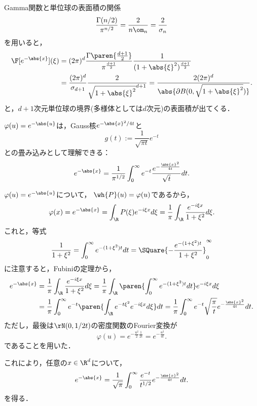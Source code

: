 \documentclass[uplatex,dvipdfmx]{jsreport}
\begin{document}
\begin{remarks}
    Gamma関数と単位球の表面積の関係
    \[\frac{\Gamma(n/2)}{\pi^{n/2}}=\frac{2}{n\om_n}=\frac{2}{\sigma_n}\]
    を用いると，
    \begin{align*}
        \F[e^{-\abs{x}}](\xi)&=(2\pi)^d\frac{\Gamma\paren{\frac{d+1}{2}}}{\pi^{\frac{d+1}{2}}}\frac{1}{(1+\abs{\xi}^2)^{\frac{d+1}{2}}}\\
        &=\frac{(2\pi)^d}{\sigma_{d+1}}\frac{2}{\sqrt{1+\abs{\xi}^2}^{d+1}}=\frac{2(2\pi)^d}{\abs{\partial B(0,\sqrt{1+\abs{\xi}^2})}}.
    \end{align*}
    と，$d+1$次元単位球の境界(多様体としては$d$次元)の表面積が出てくる．
\end{remarks}

\begin{lemma}
    $\varphi(u)=e^{-\abs{u}}$は，Gauss核$e^{-\abs{x}^2/4t}$と
    \[g(t):=\frac{1}{\sqrt{\pi t}}e^{-t}\]
    との畳み込みとして理解できる：
    \[e^{-\abs{x}}=\frac{1}{\pi^{1/2}}\int^\infty_0e^{-t}\frac{e^{-\frac{\abs{x}^2}{4t}}}{\sqrt{t}}dt.\]
\end{lemma}
\begin{Proof}
    $\varphi(u)=e^{-\abs{u}}$について，
    $\wh{P}(u)=\varphi(u)$であるから，
    \[\varphi(x)=e^{-\abs{x}}=\int_\R P(\xi)e^{-i\xi x}d\xi=\frac{1}{\pi}\int_\R\frac{e^{-i\xi x}}{1+\xi^2}d\xi.\]
    これと，等式
    \[\frac{1}{1+\xi^2}=\int^\infty_0e^{-(1+\xi^2)t}dt=\SQuare{-\frac{e^{-(1+\xi^2)t}}{1+\xi^2}}^\infty_0\]
    に注意すると，Fubiniの定理から，
    \begin{align*}
        e^{-\abs{x}}&=\frac{1}{\pi}\int_\R\frac{e^{-i\xi x}}{1+\xi^2}d\xi=\frac{1}{\pi}\int_\R\paren{\int^\infty_0e^{-(1+\xi^2)t}dt}e^{-i\xi x}d\xi\\
        &=\frac{1}{\pi}\int^\infty_0e^{-t}\paren{\int_\R e^{-t\xi^2}e^{-i\xi x}d\xi}dt=\frac{1}{\pi}\int^\infty_0e^{-t}\sqrt{\frac{\pi}{t}}e^{-\frac{\abs{x}^2}{4t}}dt.
    \end{align*}
    ただし，最後は$\rN(0,1/2t)$の密度関数のFourier変換が
    \[\varphi(u)=e^{-\frac{u^2}{2}\frac{1}{2t}}=e^{-\frac{u^2}{4t}}.\]
    であることを用いた．
\end{Proof}
\begin{remarks}
    これにより，任意の$x\in\R^d$について，
    \[e^{-\abs{x}}=\frac{1}{\sqrt{\pi}}\int^\infty_0\frac{e^{-t}}{t^{1/2}}e^{-\frac{\abs{x}^2}{4t}}dt.\]
    を得る．
\end{remarks}
\end{document}
